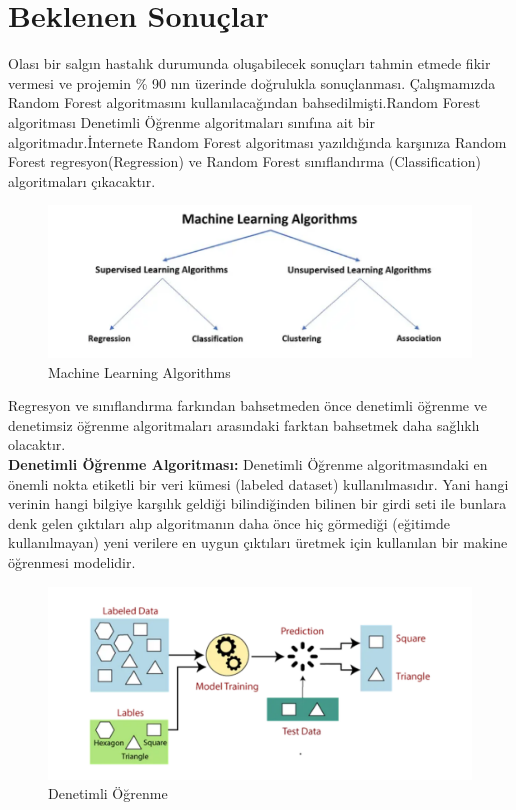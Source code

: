 \documentclass[12pt, a4paper]{article}
\begin{document}
\section{Beklenen Sonuçlar}
Olası bir salgın hastalık durumunda oluşabilecek sonuçları tahmin etmede fikir vermesi ve
projemin \% 90 nın üzerinde doğrulukla sonuçlanması.
\newpage
Çalışmamızda Random Forest algoritmasını kullanılacağından bahsedilmişti.Random Forest algoritması Denetimli Öğrenme algoritmaları sınıfına ait bir algoritmadır.İnternete Random Forest algoritması yazıldığında karşınıza Random Forest regresyon(Regression) ve Random Forest sınıflandırma (Classification) algoritmaları çıkacaktır.
\begin{figure}[!htbp] 
	\caption{ Machine Learning Algorithms }
	\centering
	\includegraphics[angle=0, width=\textwidth]{resim3.png}
	
\end{figure} 
\newline Regresyon ve sınıflandırma farkından bahsetmeden önce denetimli öğrenme ve denetimsiz öğrenme algoritmaları arasındaki farktan bahsetmek daha sağlıklı olacaktır.\\
\textbf{Denetimli Öğrenme Algoritması:} Denetimli Öğrenme algoritmasındaki en önemli nokta etiketli bir veri kümesi (labeled dataset) kullanılmasıdır. Yani hangi verinin hangi bilgiye karşılık geldiği bilindiğinden bilinen bir girdi seti ile bunlara denk gelen çıktıları alıp algoritmanın daha önce hiç görmediği (eğitimde kullanılmayan) yeni verilere en uygun çıktıları üretmek için kullanılan bir makine öğrenmesi modelidir.\cite{site2}
\newpage
\begin{figure}[!htbp] 
	\caption{ Denetimli Öğrenme  }
	\centering
	\includegraphics[angle=0, width=\textwidth]{resim1.png}
	
\end{figure} 
\end{document}
